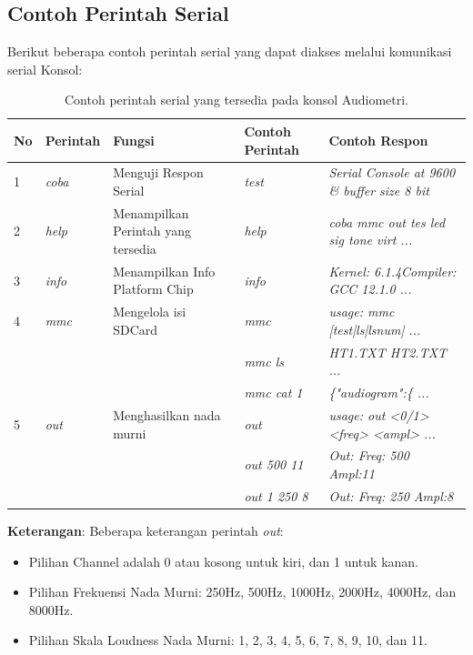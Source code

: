 \documentclass[12pt]{book}
\begin{document}
	\newpage
	\subsection{Contoh Perintah Serial}

	Berikut beberapa contoh perintah serial yang dapat diakses melalui komunikasi serial Konsol:

	\begin{table}[!ht]
		\centering
		\begin{tabular}{|l|l|l|l|l|}
			\hline
			\textbf{No} & \textbf{Perintah} & \textbf{Fungsi} & \textbf{Contoh Perintah} & \textbf{Contoh Respon} \\
			\hline
			1 & \textit{coba} & Menguji Respon Serial & \textit{test} & \textit{Serial Console at 9600 \& buffer size 8 bit} \\
			\hline
			2 & \textit{help} & Menampilkan Perintah yang tersedia & \textit{help} & \textit{coba mmc out tes led sig tone virt ...} \\
			\hline
			3 & \textit{info} & Menampilkan Info Platform Chip & \textit{info} & \textit{Kernel: 6.1.4Compiler: GCC 12.1.0 ...} \\
			\hline
			4 & \textit{mmc} & Mengelola isi SDCard & \textit{mmc} & \textit{usage: mmc [test|ls|lsnum| ...} \\
			& & & \textit{mmc ls} & \textit{HT1.TXT HT2.TXT ...} \\
			& & & \textit{mmc cat 1} & \textit{\{"audiogram":\{ ...} \\
			\hline
			5 & \textit{out} & Menghasilkan nada murni &  \textit{out} & \textit{usage: out <0/1> <freq> <ampl> ...} \\
			& & & \textit{out 500 11} & \textit{Out: Freq:  500 Ampl:11} \\
			& & & \textit{out 1 250 8} & \textit{Out: Freq:  250 Ampl:8} \\
			\hline
		\end{tabular}

		\caption{Contoh perintah serial yang tersedia pada konsol Audiometri.}
	\end{table}

	\textbf{Keterangan}: Beberapa keterangan perintah \textit{out}:
	\begin{itemize}
		\item Pilihan Channel adalah 0 atau kosong untuk kiri, dan 1 untuk kanan.
		\item Pilihan Frekuensi Nada Murni: 250Hz, 500Hz, 1000Hz, 2000Hz, 4000Hz, dan 8000Hz.
		\item Pilihan Skala Loudness Nada Murni: 1, 2, 3, 4, 5, 6, 7, 8, 9, 10, dan 11.
	\end{itemize}
\end{document}
